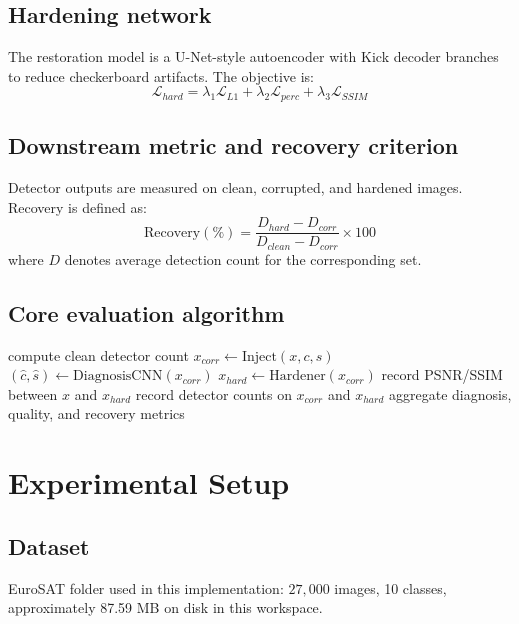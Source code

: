 \documentclass[11pt]{article}
\begin{document}
\subsection{Hardening network}
The restoration model is a U-Net-style autoencoder with Kick decoder branches to reduce checkerboard artifacts. The objective is:
\begin{equation}
\mathcal{L}_{hard} = \lambda_1 \mathcal{L}_{L1} + \lambda_2 \mathcal{L}_{perc} + \lambda_3 \mathcal{L}_{SSIM}
\end{equation}

\subsection{Downstream metric and recovery criterion}
Detector outputs are measured on clean, corrupted, and hardened images. Recovery is defined as:
\begin{equation}
\text{Recovery}(\%) = \frac{D_{hard} - D_{corr}}{D_{clean}-D_{corr}} \times 100
\end{equation}
where $D$ denotes average detection count for the corresponding set.

\subsection{Core evaluation algorithm}
\begin{algorithm}[H]
\caption{Corruption-to-Recovery Evaluation}
\begin{algorithmic}[1]
  \State compute clean detector count
\EndFor
{}
      \State $x_{corr} \leftarrow \text{Inject}(x,c,s)$
      \State $(\hat{c},\hat{s}) \leftarrow \text{DiagnosisCNN}(x_{corr})$
      \State $x_{hard} \leftarrow \text{Hardener}(x_{corr})$
      \State record PSNR/SSIM between $x$ and $x_{hard}$
      \State record detector counts on $x_{corr}$ and $x_{hard}$
    \EndFor
    \State aggregate diagnosis, quality, and recovery metrics
  \EndFor
\EndFor
\end{algorithmic}
\end{algorithm}

\section{Experimental Setup}
\subsection{Dataset}
EuroSAT folder used in this implementation: $27{,}000$ images, 10 classes, approximately 87.59 MB on disk in this workspace.
\end{document}
